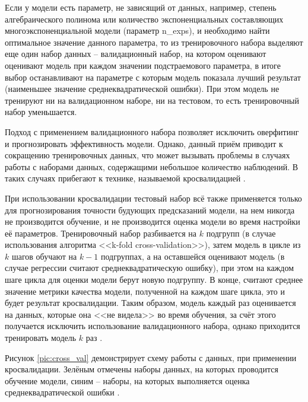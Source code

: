     Если у модели есть параметр, не зависящий от данных, например, степень
    алгебраического полинома или количество экспоненциальных составляющих 
    многоэкспоненциальной модели (параметр n\_exps), и необходимо найти 
    оптимальное значение данного параметра, то из тренировочного набора выделяют
    еще один набор данных -- валидационный набор, на котором оценивают
    оценивают модель при каждом значении подстраемового параметра, в итоге
    выбор останавливают на параметре с которым модель показала лучший результат
    (наименьшее значение среднеквадратической ошибки). При этом модель не 
    тренируют ни на валидационном наборе, ни на тестовом, то есть тренировочный 
    набор уменьшается.

    Подход с применением валидационного набора позволяет исключить оверфитинг 
    и прогнозировать эффективность модели. Однако, данный приём приводит к 
    сокращению тренировочных данных, что может вызывать проблемы в случаях 
    работы с наборами данных, содержащими небольшое количество наблюдений. В 
    таких случаях прибегают к технике, называемой кросвалидацией 
    \cite{hands_on_ml, sklearn_cross_validation}.

    При использовании кросвалидации тестовый набор всё также применяется только
    для прогнозирования точности будующих предсказаний модели, на нем никогда 
    не производится обучение, и не производится оценка модели во время
    настройки её параметров. Тренировочный набор разбивается на $k$ подгрупп
    (в случае использования алгоритма  <<k-fold cross-validation>>), затем 
    модель в цикле из $k$ шагов обучают на $k-1$ подгруппах, а на оставшейся 
    оценивают модель (в случае регрессии считают среднеквадратическую ошибку), 
    при этом на каждом шаге цикла для оценки модели берут новую подгруппу. В 
    конце, считают среднее значение метрики качества модели, полученной на 
    каждом шаге цикла, это и будет результат кросвалидации. Таким образом, 
    модель каждый раз оценивается на данных, которые она <<не видела>> во время 
    обучения, за счёт этого получается исключить использование валидационного 
    набора, однако приходится тренировать модель $k$ раз 
    \cite{sklearn_cross_validation}. 

    Рисунок \ref{pic:cross_val} демонстрирует схему работы с данных, при 
    применении кросвалидации. Зелёным отмечены наборы данных, на которых 
    проводится обучение модели, синим -- наборы, на которых выполняется оценка
    среднеквадратической ошибки \cite{sklearn_cross_validation}.

